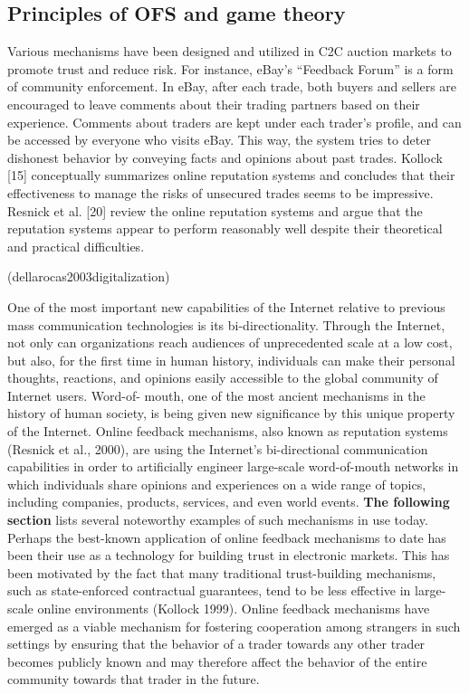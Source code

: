 \documentclass[a4paper, 11pt]{article}
\begin{document}
\subsection{Principles of OFS and game theory}

Various mechanisms have been designed and utilized
in C2C auction markets to promote trust and reduce risk.
For instance,
eBay's “Feedback Forum” is a form of community enforcement.
In eBay, after each trade, both buyers and
sellers are encouraged to leave comments about their
trading partners based on their experience. Comments
about traders are kept under each trader's profile, and can
be accessed by everyone who visits eBay. This way, the
system tries to deter dishonest behavior by conveying
facts and opinions about past trades. Kollock [15]
conceptually summarizes online reputation systems and
concludes that their effectiveness to manage the risks of
unsecured trades seems to be impressive. Resnick et al.
[20] review the online reputation systems and argue that
the reputation systems appear to perform reasonably well
despite their theoretical and practical difficulties. \cite{yang2007effects}

(dellarocas2003digitalization) 

One of the most important new capabilities of the Internet relative to previous mass
communication technologies is its bi-directionality. Through the Internet, not only can
organizations reach audiences of unprecedented scale at a low cost, but also, for the first time in
human history, individuals can make their personal thoughts, reactions, and opinions easily
accessible to the global community of Internet users.
Word-of- mouth, one of the most ancient mechanisms in the history of human society, is being
given new significance by this unique property of the Internet. Online feedback mechanisms, also
known as reputation systems (Resnick et al., 2000), are using the Internet's bi-directional
communication capabilities in order to artificially engineer large-scale word-of-mouth networks
in which individuals share opinions and experiences on a wide range of topics, including
companies, products, services, and even world events. \textbf{The following section} lists several noteworthy examples
of such mechanisms in use today.
Perhaps the best-known application of online feedback mechanisms to date has been their use as
a technology for building trust in electronic markets. This has been motivated by the fact that
many traditional trust-building mechanisms, such as state-enforced contractual guarantees, tend
to be less effective in large-scale online environments (Kollock 1999). Online feedback
mechanisms have emerged as a viable mechanism for fostering cooperation among strangers in
such settings by ensuring that the behavior of a trader towards any other trader becomes publicly
known and may therefore affect the behavior of the entire community towards that trader in the
future.
\end{document}
